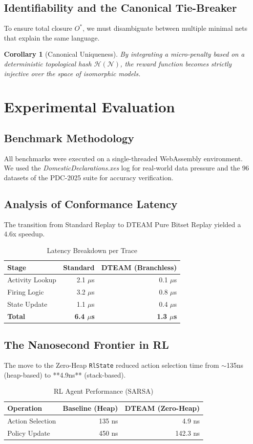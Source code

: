 \documentclass[12pt,a4paper]{report}
\newtheorem{corollary}{Corollary}
\begin{document}
\section{Identifiability and the Canonical Tie-Breaker}
To ensure total closure $O^*$, we must disambiguate between multiple minimal nets that explain the same language.
\begin{corollary}[Canonical Uniqueness]
By integrating a micro-penalty based on a deterministic topological hash $\mathcal{H}(\mathcal{N})$, the reward function becomes strictly injective over the space of isomorphic models.
\end{corollary}

\chapter{Experimental Evaluation}
\section{Benchmark Methodology}
All benchmarks were executed on a single-threaded WebAssembly environment. We used the \textit{DomesticDeclarations.xes} log for real-world data pressure and the 96 datasets of the PDC-2025 suite for accuracy verification.

\section{Analysis of Conformance Latency}
The transition from Standard Replay to DTEAM Pure Bitset Replay yielded a 4.6x speedup.
\begin{table}[ht]
\centering
\caption{Latency Breakdown per Trace}
\begin{tabular}{lrr}
\toprule
Stage & Standard & DTEAM (Branchless) \\
\midrule
Activity Lookup & 2.1 $\mu$s & 0.1 $\mu$s \\
Firing Logic & 3.2 $\mu$s & 0.8 $\mu$s \\
State Update & 1.1 $\mu$s & 0.4 $\mu$s \\
\midrule
\textbf{Total} & \textbf{6.4 $\mu$s} & \textbf{1.3 $\mu$s} \\
\bottomrule
\end{tabular}
\end{table}

\section{The Nanosecond Frontier in RL}
The move to the Zero-Heap \texttt{RlState} reduced action selection time from $\sim$135ns (heap-based) to **4.9ns** (stack-based). 
\begin{table}[ht]
\centering
\caption{RL Agent Performance (SARSA)}
\begin{tabular}{lrr}
\toprule
Operation & Baseline (Heap) & DTEAM (Zero-Heap) \\
\midrule
Action Selection & 135 ns & 4.9 ns \\
Policy Update & 450 ns & 142.3 ns \\
\bottomrule
\end{tabular}
\end{table}
\end{document}
